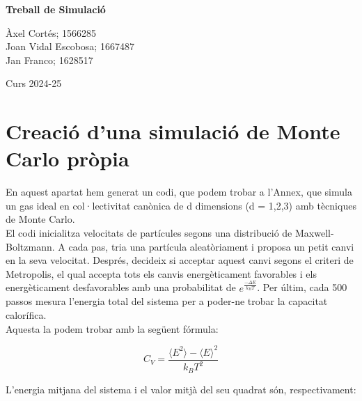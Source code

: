 \documentclass{article}
\begin{document}
	
	\begin{titlepage}
		\begin{center}
			\vspace*{1cm}
			
			\Huge
			\textbf{Treball de Simulació} \\
			
			\vspace{0.5cm}
			
			
			
			
			\vspace{1.5cm}
			\Large
			Àxel Cortés; 1566285 \\
			Joan Vidal Escobosa; 1667487 \\
			Jan Franco; 1628517 \\ 
			
			
			\vfill
			\LARGE
			
			\vspace{0.8cm}
			
			\Large
			Curs 2024-25 
		\end{center} 
	\end{titlepage}
	
	\setcounter{page}{1}
	
	\section{Creació d'una simulació de Monte Carlo pròpia}
	En aquest apartat hem generat un codi, que podem trobar a l'Annex, que simula un gas ideal en col·lectivitat canònica de d dimensions (d = 1,2,3) amb tècniques de Monte Carlo.
	\\
	El codi inicialitza velocitats de partícules segons una distribució de Maxwell-Boltzmann. A cada pas, tria una partícula aleatòriament i proposa un petit canvi en la seva velocitat. Després, decideix si acceptar aquest canvi segons el criteri de Metropolis, el qual accepta tots els canvis energèticament favorables i els energèticament desfavorables amb una probabilitat de $e^{\frac{-\Delta E}{k_BT}}$. Per últim, cada 500 passos mesura l'energia total del sistema per a poder-ne trobar la capacitat calorífica.
	\\
	Aquesta la podem trobar amb la següent fórmula:
	
	\begin{equation}
		C_V = \frac{\langle E^2 \rangle - \langle E \rangle^2}{k_B T^2}
		\label{eq. c_v}
	\end{equation}
	
	\noindent L'energia mitjana del sistema i el valor mitjà del seu quadrat són, respectivament:
	
\end{document}
